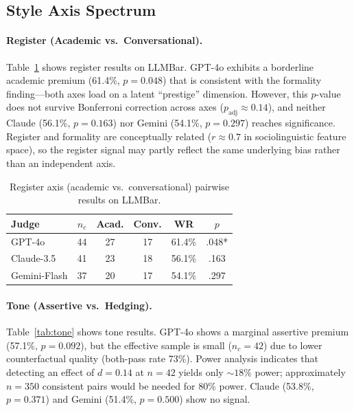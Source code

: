 \documentclass[11pt,a4paper]{article}
\begin{document}
\subsection{Style Axis Spectrum}
\label{sec:spectrum}

\paragraph{Register (Academic vs.\ Conversational).}
Table~\ref{tab:register} shows register results on LLMBar.
GPT-4o exhibits a borderline academic premium (61.4\%, $p{=}0.048$) that is consistent with the formality finding---both axes load on a latent ``prestige'' dimension.
However, this $p$-value does not survive Bonferroni correction across axes ($p_{\text{adj}}{\approx}0.14$), and neither Claude (56.1\%, $p{=}0.163$) nor Gemini (54.1\%, $p{=}0.297$) reaches significance.
Register and formality are conceptually related ($r{\approx}0.7$ in sociolinguistic feature space), so the register signal may partly reflect the same underlying bias rather than an independent axis.

\begin{table}[t]
\centering
\small
\begin{tabular}{lccccc}
\toprule
\textbf{Judge} & $n_c$ & \textbf{Acad.} & \textbf{Conv.} & \textbf{WR} & \textbf{$p$} \\
\midrule
GPT-4o & 44 & 27 & 17 & 61.4\% & .048* \\
Claude-3.5 & 41 & 23 & 18 & 56.1\% & .163 \\
Gemini-Flash & 37 & 20 & 17 & 54.1\% & .297 \\
\bottomrule
\end{tabular}
\caption{Register axis (academic vs.\ conversational) pairwise results on LLMBar.}
\label{tab:register}
\end{table}

\paragraph{Tone (Assertive vs.\ Hedging).}
Table~\ref{tab:tone} shows tone results.
GPT-4o shows a marginal assertive premium (57.1\%, $p{=}0.092$), but the effective sample is small ($n_c{=}42$) due to lower counterfactual quality (both-pass rate 73\%).
Power analysis indicates that detecting an effect of $d{=}0.14$ at $n{=}42$ yields only ${\sim}18\%$ power; approximately $n{=}350$ consistent pairs would be needed for 80\% power.
Claude (53.8\%, $p{=}0.371$) and Gemini (51.4\%, $p{=}0.500$) show no signal.
\end{document}
